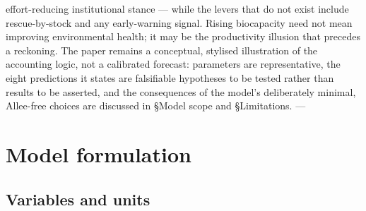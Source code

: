 \documentclass[11pt]{article}
\begin{document}
effort-reducing institutional stance — while the levers that do not exist include rescue-by-stock and any early-warning signal. Rising biocapacity need not mean improving environmental health; it may be the productivity illusion that precedes a reckoning. The paper remains a conceptual, stylised illustration of the accounting logic, not a calibrated forecast: parameters are representative, the eight predictions it states are falsifiable hypotheses to be tested rather than results to be asserted, and the consequences of the model's deliberately minimal, Allee-free choices are discussed in §Model scope and §Limitations. ---

\section{Model formulation}

\subsection{Variables and units}
\end{document}
